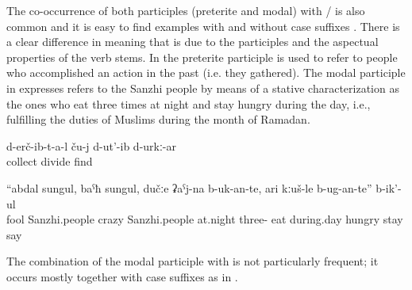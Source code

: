 The co-occurrence of both participles (preterite and modal) with \slash{} is also common and it is easy to find examples with  and without case suffixes . There is a clear difference in meaning that is due to the participles and the aspectual properties of the verb stems. In  the preterite participle is used to refer to people who accomplished an action in the past (i.e. they gathered). The modal participle in  expresses refers to the Sanzhi people by means of a stative characterization as the ones who eat three times at night and stay hungry during the day, i.e., fulfilling the duties of Muslims during the month of Ramadan.
%
\begin{exe}
	\ex	\label{ex:‎‎‎The ones that gathered (the food) probably divided it among themselves}
	\gll	d-erč-ib-t-a-l	ču-j	d-ut'-ib	d-urkː-ar\\
		collect		divide	find\\
	\glt	{}

	\ex	\label{ex:‎‎Foolish Sanzhi people, crazy Sаnzhi people, at night they eat three times, and during day they stay hungry they said}
	\gll	``abdal	sungul,		baˁħ	sungul,		dučːe		ʡaˁj-na	b-uk-an-te, 					ari 		kːuš-le		b-ug-an-te'' 							b-ik'-ul\\
		fool	Sanzhi.people	crazy	Sanzhi.people	at.night	three-	eat 	during.day	hungry	\tsc{hpl-}stay 	say\\
	\glt	{}
\end{exe}


The combination of the modal participle with  is not particularly frequent; it occurs mostly together with case suffixes as in . 

